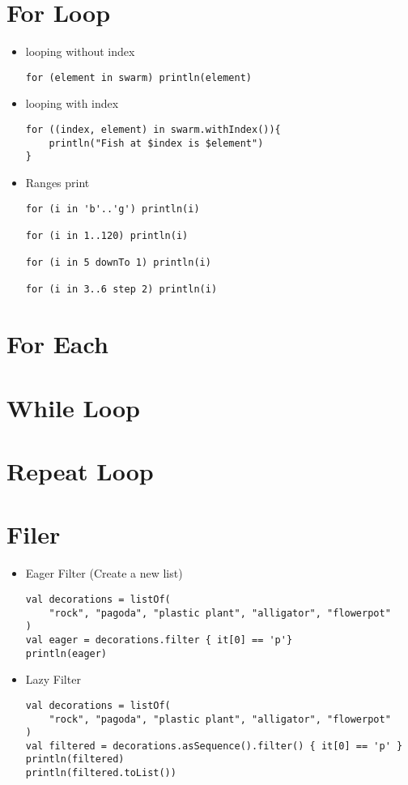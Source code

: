 \documentclass[11pt]{article}
\begin{document}
\section*{For Loop}
\label{sec:org996b439}
\begin{itemize}
\item looping without index
\begin{verbatim}
for (element in swarm) println(element)
\end{verbatim}
\item looping with index
\begin{verbatim}
for ((index, element) in swarm.withIndex()){
    println("Fish at $index is $element")
}
\end{verbatim}
\item Ranges print
\begin{verbatim}
for (i in 'b'..'g') println(i)

for (i in 1..120) println(i)

for (i in 5 downTo 1) println(i)

for (i in 3..6 step 2) println(i)
\end{verbatim}
\end{itemize}
\section*{For Each}
\label{sec:orge817409}
\section*{While Loop}
\label{sec:orgd19467f}
\section*{Repeat Loop}
\label{sec:org6e859f9}
\section*{Filer}
\label{sec:orga3ad6a3}
\begin{itemize}
\item Eager Filter (Create a new list)
\begin{verbatim}
val decorations = listOf(
    "rock", "pagoda", "plastic plant", "alligator", "flowerpot"
)
val eager = decorations.filter { it[0] == 'p'}
println(eager)
\end{verbatim}

\item Lazy Filter 
\begin{verbatim}
val decorations = listOf(
    "rock", "pagoda", "plastic plant", "alligator", "flowerpot"
)
val filtered = decorations.asSequence().filter() { it[0] == 'p' }
println(filtered)
println(filtered.toList())
\end{verbatim}
\end{itemize}
\end{document}
